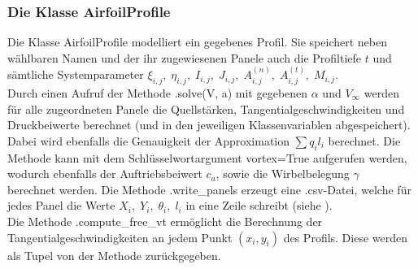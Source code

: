 \subsubsection{Die Klasse AirfoilProfile}
Die Klasse AirfoilProfile modelliert ein gegebenes Profil. Sie speichert neben wählbaren Namen und der ihr zugewiesenen Panele auch die Profiltiefe $t$ und sämtliche Systemparameter $\xi_{i,j}, \; \eta_{i,j}, \; I_{i,j}, \; J_{i,j}, \; A_{i,j}^{(n)}, \;A_{i,j}^{(t)}, \;M_{i,j}$. \\
Durch einen Aufruf der Methode .solve(V, a) mit gegebenen $\alpha $ und $V_{\infty}$ werden für alle zugeordneten Panele die Quellstärken, Tangentialgeschwindigkeiten und Druckbeiwerte berechnet (und in den jeweiligen Klassenvariablen abgespeichert). Dabei wird ebenfalls die Genauigkeit der Approximation $\sum q_i l_i$ berechnet. Die Methode kann mit dem Schlüsselwortargument vortex=True aufgerufen werden, wodurch ebenfalls der Auftriebsbeiwert $c_a$, sowie die Wirbelbelegung $\gamma$ \\ berechnet werden.
Die Methode .write\_panels erzeugt eine .csv-Datei, welche für jedes Panel die Werte $X_i,\; Y_i,\; \theta_i,\; l_i$ in eine Zeile schreibt (siehe ). \\
Die Methode .compute\_free\_vt ermöglicht die Berechnung der Tangentialgeschwindigkeiten an jedem Punkt $(x_i, y_i)$ des Profils. Diese werden als Tupel von der Methode zurückgegeben.
